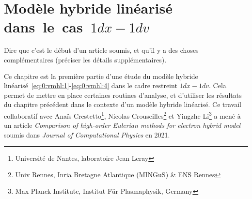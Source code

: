 \renewcommand{\localPath}{chap2}

\chapter{Modèle hybride linéarisé dans~le~cas~$1dx-1dv$}
\label{chap2}

Dire que c'est le début d'un article soumis, et qu'il y a des choses complémentaires (préciser les détails supplémentaires).

Ce chapitre est la première partie d'une étude du modèle hybride linéarisé~\eqref{eq:0:vmhl:1}-\eqref{eq:0:vmhl:4} dans le cadre restreint $1dx-1dv$. Cela permet de mettre en place certaines routines d'analyse, et d'utiliser les résultats du chapitre précédent dans le contexte d'un modèle hybride linéarisé. Ce travail collaboratif avec Anaïs Crestetto\footnote{Université de Nantes, laboratoire Jean Leray}, Nicolas Crouseilles\footnote{Univ Rennes, Inria Bretagne Atlantique (MINGuS) \& ENS Rennes} et Yingzhe Li\footnote{Max Planck Institute, Institut Für Plasmaphysik, Germany} a mené à un article \emph{Comparison of high-order Eulerian methods for electron hybrid model} soumis dans \emph{Journal of Computational Physics} en 2021.









\begin{subappendices}

\end{subappendices}


